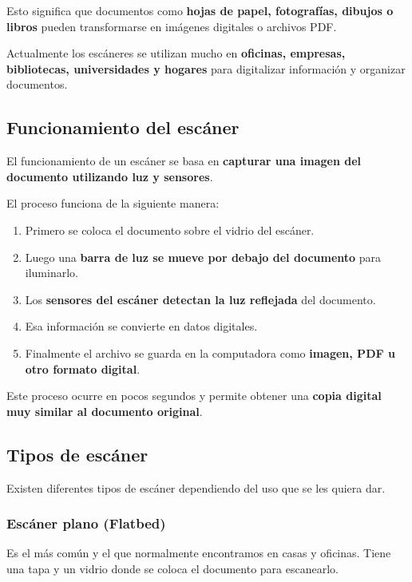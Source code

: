 \documentclass[12pt, letterpaper]{article}
\begin{document}
Esto significa que documentos como \textbf{hojas de papel, fotografías, dibujos o libros} pueden transformarse en imágenes digitales o archivos PDF.

Actualmente los escáneres se utilizan mucho en \textbf{oficinas, empresas, bibliotecas, universidades y hogares} para digitalizar información y organizar documentos.

\subsection{Funcionamiento del escáner}

El funcionamiento de un escáner se basa en \textbf{capturar una imagen del documento utilizando luz y sensores}.

El proceso funciona de la siguiente manera:

\begin{enumerate}

\item  Primero se coloca el documento sobre el vidrio del escáner.
\item  Luego una \textbf{barra de luz se mueve por debajo del documento} para iluminarlo.
\item  Los \textbf{sensores del escáner detectan la luz reflejada} del documento.
\item  Esa información se convierte en datos digitales.
\item  Finalmente el archivo se guarda en la computadora como \textbf{imagen, PDF u otro formato digital}.

\end{enumerate}

Este proceso ocurre en pocos segundos y permite obtener una \textbf{copia digital muy similar al documento original}.

\subsection{Tipos de escáner}

Existen diferentes tipos de escáner dependiendo del uso que se les quiera dar.

\subsubsection{Escáner plano (Flatbed)}

Es el más común y el que normalmente encontramos en casas y oficinas.
Tiene una tapa y un vidrio donde se coloca el documento para escanearlo.
\end{document}
